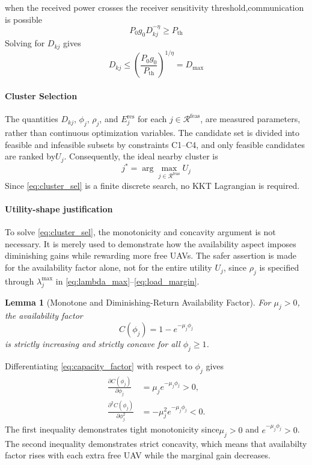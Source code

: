\documentclass[journal]{IEEEtran}
\newtheorem{lemma}{Lemma}
\begin{document}
\begin{IEEEproof}
\begin{IEEEproof}
when the received power crosses the receiver sensitivity threshold,communication is possible
\[
  P_{0}g_{0}D_{kj}^{-\eta}\geq P_{\mathrm{th}} 
\]
Solving for $D_{kj}$ gives
\[
  D_{kj}\leq\left(\frac{P_{0}g_{0}}{P_{\mathrm{th}}}\right)^{1/\eta}
  =D_{\max} 
\]
\end{IEEEproof}

\paragraph{Cluster Selection}
The quantities $D_{kj}$,
$\phi_{j}$, $\rho_{j}$, and $E_{j}^{\mathrm{res}}$ for each $j\in\mathcal{R}^{\mathrm{feas}}$, are measured parameters,
rather than continuous optimization variables.  
The candidate set is divided into  feasible and infeasible subsets by constraints C1--C4, and only feasible candidates are ranked by$U_{j}$. Consequently, the ideal nearby cluster is
\begin{equation}
  j^{*}=\arg\max_{j\in\mathcal{R}^{\mathrm{feas}}}U_{j} 
  \label{eq:cluster_sel}
\end{equation}
Since \eqref{eq:cluster_sel} is a finite discrete search, no KKT Lagrangian
is required.

\paragraph{Utility-shape justification}
To solve \eqref{eq:cluster_sel}, the monotonicity and concavity argument is not necessary. It is merely used to demonstrate how the availability aspect imposes diminishing gains while rewarding more free UAVs.
The safer assertion is made for the availability factor alone, not for the entire utility $U_{j}$, since $\rho_{j}$ is specified through $\lambda_{j}^{\max}$ in \eqref{eq:lambda_max}--\eqref{eq:load_margin}.

\begin{lemma}[Monotone and Diminishing-Return Availability Factor]
\label{lem:availability_shape}
For $\mu_{j}>0$, the availability factor
\begin{equation}
  C(\phi_{j})=1-e^{-\mu_{j}\phi_{j}}
  \label{eq:capacity_factor}
\end{equation}
is strictly increasing and strictly concave for all $\phi_{j}\geq1$.
\end{lemma}

\begin{IEEEproof}
Differentiating \eqref{eq:capacity_factor} with respect to $\phi_{j}$ gives
\begin{align}
  \frac{\partial C(\phi_{j})}{\partial\phi_{j}}
  &=\mu_{j}e^{-\mu_{j}\phi_{j}}>0,
  \label{eq:dC}\\
  \frac{\partial^{2}C(\phi_{j})}{\partial\phi_{j}^{2}}
  &=-\mu_{j}^{2}e^{-\mu_{j}\phi_{j}}<0.
  \label{eq:d2C}
\end{align}
The first inequality demonstrates tight monotonicity since$\mu_{j}>0$ and
$e^{-\mu_{j}\phi_{j}}>0$. The second
inequality demonstrates strict concavity, which means that availabilty factor rises with each extra free UAV while the marginal gain decreases.
\end{IEEEproof}


\end{IEEEproof}
\end{document}
